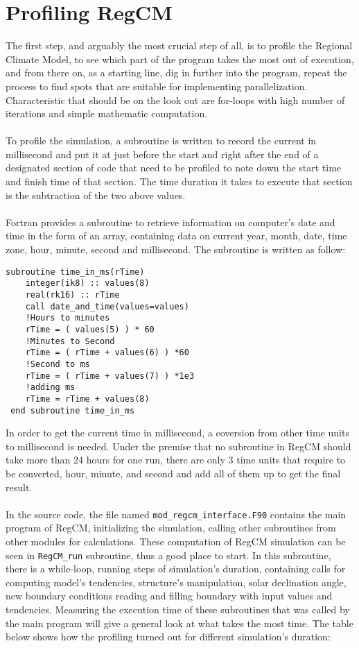 \section{Profiling RegCM}
The first step, and arguably the most crucial step of all, is to profile the Regional Climate Model, to see which part of the program takes the most out of execution, and from there on, as a starting line, dig in further into the program, repeat the process to find spots that are suitable for implementing parallelization. Characteristic that should be on the look out are for-loops with high number of iterations and simple mathematic computation. \\
~\\
To profile the simulation, a subroutine is written to record the current in millisecond and put it at just before the start and right after the end of a designated section of code that need to be profiled to note down the start time and finish time of that section. The time duration it takes to execute that section is the subtraction of the two above values. \\
~\\
Fortran provides a subroutine to retrieve information on computer's date and time in the form of an array, containing data on current year, month, date, time zone, hour, minute, second and millisecond. The subroutine is written as follow:
\begin{center}
\begin{BVerbatim}
subroutine time_in_ms(rTime)
    integer(ik8) :: values(8)
    real(rk16) :: rTime
    call date_and_time(values=values)
    !Hours to minutes  
    rTime = ( values(5) ) * 60
    !Minutes to Second
    rTime = ( rTime + values(6) ) *60
    !Second to ms 
    rTime = ( rTime + values(7) ) *1e3
    !adding ms 
    rTime = rTime + values(8)
 end subroutine time_in_ms
\end{BVerbatim}
\end{center}
In order to get the current time in millisecond, a coversion from other time units to millisecond is needed. Under the premise that no subroutine in RegCM should take more than 24 hours for one run, there are only 3 time units that require to be converted, hour, minute, and second and add all of them up to get the final result.  \\
~\\
In the source code, the file named \verb|mod_regcm_interface.F90| contains the main program of RegCM, initializing the simulation, calling other subroutines from other modules for calculations. These computation of RegCM simulation can be seen in \verb|RegCM_run| subroutine, thus a good place to start. In this subroutine, there is a while-loop, running steps of simulation's duration, containing calls for computing model's tendencies, structure's manipulation, solar declination angle, new boundary conditions reading and filling boundary with input values and tendencies. Measuring the execution time of these subroutines that was called by the main program will give a general look at what takes the most time. The table below shows how the profiling turned out for different simulation's duration: \\

